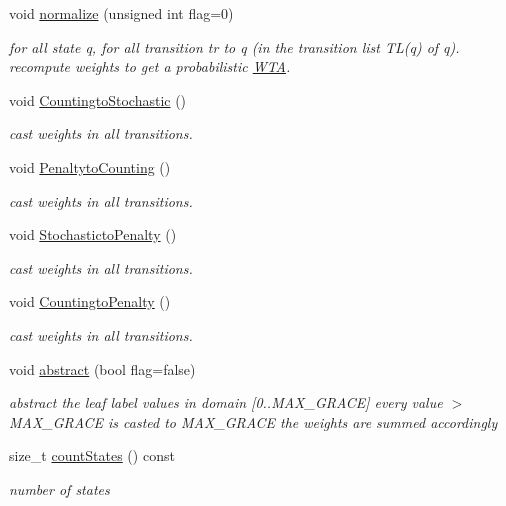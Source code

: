 \begin{DoxyCompactItemize}
void \mbox{\hyperlink{classWTA_aa4eda8d626af33674c59fef22c8220c1}{normalize}} (unsigned int flag=0)
\begin{DoxyCompactList}\small\item\em for all state q, for all transition tr to q (in the transition list T\+L(q) of q). recompute weights to get a probabilistic \mbox{\hyperlink{classWTA}{W\+TA}}. \end{DoxyCompactList}\item 
void \mbox{\hyperlink{group__schemata_ga8dfef6b591f952f0fea9dae1f5e475c7}{Countingto\+Stochastic}} ()
\begin{DoxyCompactList}\small\item\em cast weights in all transitions. \end{DoxyCompactList}\item 
void \mbox{\hyperlink{group__schemata_gaff1196a45ffd1400bc4004e27b167218}{Penaltyto\+Counting}} ()
\begin{DoxyCompactList}\small\item\em cast weights in all transitions. \end{DoxyCompactList}\item 
void \mbox{\hyperlink{group__schemata_ga0bddc6750b18023be6976bd5cd46a2f5}{Stochasticto\+Penalty}} ()
\begin{DoxyCompactList}\small\item\em cast weights in all transitions. \end{DoxyCompactList}\item 
void \mbox{\hyperlink{group__schemata_ga5f3a0d868bf26b504cccc53b4d55e09a}{Countingto\+Penalty}} ()
\begin{DoxyCompactList}\small\item\em cast weights in all transitions. \end{DoxyCompactList}\item 
void \mbox{\hyperlink{group__schemata_ga91e272f4f9463149cd296f48e65a4185}{abstract}} (bool flag=false)
\begin{DoxyCompactList}\small\item\em abstract the leaf label values in domain \mbox{[}0..M\+A\+X\+\_\+\+G\+R\+A\+CE\mbox{]} every value $>$ M\+A\+X\+\_\+\+G\+R\+A\+CE is casted to M\+A\+X\+\_\+\+G\+R\+A\+CE the weights are summed accordingly \end{DoxyCompactList}\item 
size\+\_\+t \mbox{\hyperlink{group__schemata_ga0f6551b20a213eb88c6a7e822ebc5915}{count\+States}} () const
\begin{DoxyCompactList}\small\item\em number of states \end{DoxyCompactList}\item 

\end{DoxyCompactItemize}
